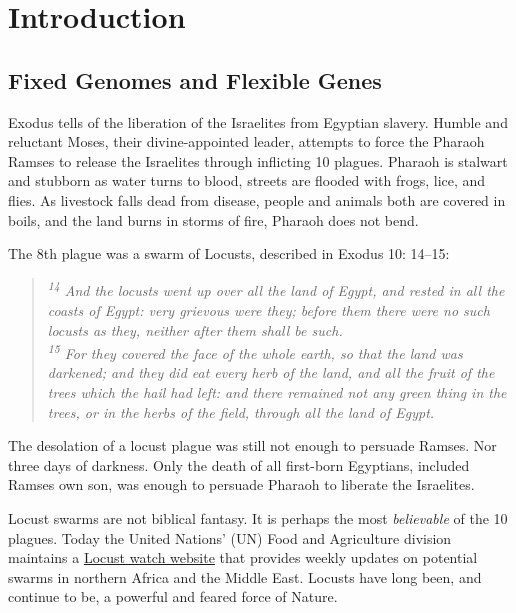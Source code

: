 \chapter{Introduction}  \label{Intro} 
\section{Fixed Genomes and Flexible Genes}\label{sec:Fixed Genomes and Flexible Genes} 

  Exodus tells of the liberation of the Israelites from Egyptian slavery. Humble and reluctant Moses, their divine-appointed leader, attempts to force the Pharaoh Ramses to release the Israelites through inflicting 10 plagues. Pharaoh is stalwart and stubborn as water turns to blood, streets are flooded with frogs, lice, and flies. As livestock falls dead from disease, people and animals both are covered in boils, and the land burns in storms of fire, Pharaoh does not bend.

  The 8th plague was a swarm of Locusts, described in Exodus 10: 14–15:

  \begin{quote}
    \itshape 
    \singlespacing
    \textsuperscript{14} And the locusts went up over all the land of Egypt, and rested in all the coasts of Egypt: very grievous were they; before them there were no such locusts as they, neither after them shall be such.\\
    \textsuperscript{15} For they covered the face of the whole earth, so that the land was darkened; and they did eat every herb of the land, and all the fruit of the trees which the hail had left: and there remained not any green thing in the trees, or in the herbs of the field, through all the land of Egypt.
    \end{quote}

  The desolation of a locust plague was still not enough to persuade Ramses. Nor three days of darkness. Only the death of all first-born Egyptians, included Ramses own son, was enough to persuade Pharaoh to liberate the Israelites.

  Locust swarms are not biblical fantasy. It is perhaps the most \textit{believable} of the 10 plagues. Today the United Nations' (UN) Food and Agriculture division maintains a \href{http://www.fao.org/ag/locusts/en/info/info/news/index.html}{Locust watch website} that provides weekly updates on potential swarms in northern Africa and the Middle East. Locusts have long been, and continue to be, a powerful and feared force of Nature.

